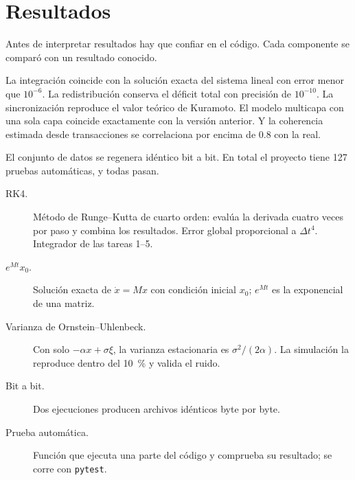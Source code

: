 \section{Resultados}

\begin{decir}
Antes de interpretar resultados hay que confiar en el código. Cada componente se
comparó con un resultado conocido.

La integración coincide con la solución exacta del sistema lineal con error menor que
$10^{-6}$. La redistribución conserva el déficit total con precisión de $10^{-10}$. La
sincronización reproduce el valor teórico de Kuramoto. El modelo multicapa con una sola
capa coincide exactamente con la versión anterior. Y la coherencia estimada desde
transacciones se correlaciona por encima de 0.8 con la real.

El conjunto de datos se regenera idéntico bit a bit. En total el proyecto tiene 127
pruebas automáticas, y todas pasan.
\end{decir}
\begin{terminos}
\begin{description}
\item[RK4.] Método de Runge–Kutta de cuarto orden: evalúa la derivada cuatro veces por
paso y combina los resultados. Error global proporcional a $\Delta t^4$. Integrador de
las tareas 1–5.
\item[$e^{Mt}x_0$.] Solución exacta de $\dot x=Mx$ con condición inicial $x_0$; $e^{Mt}$
es la exponencial de una matriz.
\item[Varianza de Ornstein–Uhlenbeck.] Con solo $-\alpha x+\sigma\xi$, la varianza
estacionaria es $\sigma^2/(2\alpha)$. La simulación la reproduce dentro del 10~\% y
valida el ruido.
\item[Bit a bit.] Dos ejecuciones producen archivos idénticos byte por byte.
\item[Prueba automática.] Función que ejecuta una parte del código y comprueba su
resultado; se corre con \texttt{pytest}.
\end{description}
\end{terminos}

